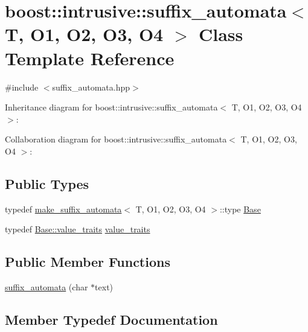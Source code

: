 \hypertarget{classboost_1_1intrusive_1_1suffix__automata}{}\section{boost\+:\+:intrusive\+:\+:suffix\+\_\+automata$<$ T, O1, O2, O3, O4 $>$ Class Template Reference}
\label{classboost_1_1intrusive_1_1suffix__automata}


{\ttfamily \#include $<$suffix\+\_\+automata.\+hpp$>$}



Inheritance diagram for boost\+:\+:intrusive\+:\+:suffix\+\_\+automata$<$ T, O1, O2, O3, O4 $>$\+:


Collaboration diagram for boost\+:\+:intrusive\+:\+:suffix\+\_\+automata$<$ T, O1, O2, O3, O4 $>$\+:
\subsection*{Public Types}
\begin{DoxyCompactItemize}
\item 
typedef \hyperlink{structboost_1_1intrusive_1_1make__suffix__automata}{make\+\_\+suffix\+\_\+automata}$<$ T, O1, O2, O3, O4 $>$\+::type \hyperlink{classboost_1_1intrusive_1_1suffix__automata_af5152d681de2ae59737825d5b2c2b027}{Base}
\item 
typedef \hyperlink{classboost_1_1intrusive_1_1suffix__automata__impl_abbf3dee8caf18613db903931801c6076}{Base\+::value\+\_\+traits} \hyperlink{classboost_1_1intrusive_1_1suffix__automata_a159d8fbab457d5f8aae6ebb5a98b18c2}{value\+\_\+traits}
\end{DoxyCompactItemize}
\subsection*{Public Member Functions}
\begin{DoxyCompactItemize}
\item 
\hyperlink{classboost_1_1intrusive_1_1suffix__automata_a671eee511bab2df95ef036be104dcefa}{suffix\+\_\+automata} (char $\ast$text)
\end{DoxyCompactItemize}


\subsection{Member Typedef Documentation}
\mbox{\label{classboost_1_1intrusive_1_1suffix__automata_af5152d681de2ae59737825d5b2c2b027}} 

